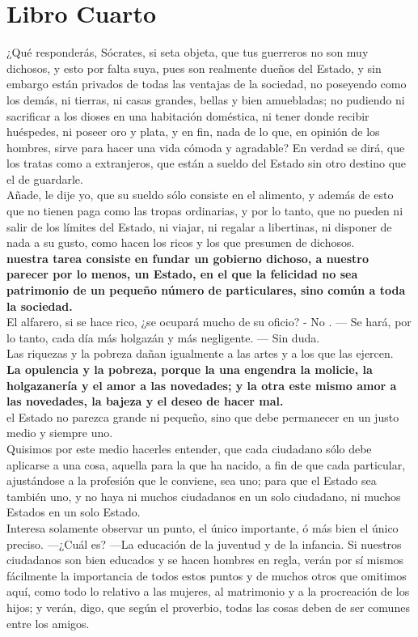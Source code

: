 \documentclass[10pt]{book}
\begin{document}
\chapter*{Libro Cuarto}
 ¿Qué responderás, Sócrates, si seta objeta, que tus guerreros no son muy dichosos, y esto por falta suya, pues son realmente dueños del Estado, y sin embargo están privados de todas las ventajas de la sociedad, no poseyendo como los demás, ni tierras, ni casas grandes, bellas y bien amuebladas; no pudiendo ni sacrificar a los dioses en una habitación doméstica, ni tener donde recibir huéspedes, ni poseer oro y plata, y en fin, nada de lo que, en opinión de los hombres, sirve para hacer una vida cómoda y agradable? En verdad se dirá, que los tratas como a extranjeros, que están a sueldo del Estado sin otro destino que el de guardarle.\\ Añade, le dije yo, que su sueldo sólo consiste en el alimento, y además de esto que no tienen paga como las tropas ordinarias, y por lo tanto, que no pueden ni salir de los límites del Estado, ni viajar, ni regalar a libertinas, ni disponer de nada a su gusto, como hacen los ricos y los que presumen de dichosos. \\
\textbf{nuestra tarea consiste en fundar un gobierno dichoso, a nuestro parecer por lo menos, un Estado, en el que la felicidad no sea patrimonio de un pequeño número de particulares, sino común a toda la sociedad.}\\
El alfarero, si se hace rico, ¿se ocupará mucho de su oficio? - No . — Se hará, por lo tanto, cada día más holgazán y más negligente. — Sin duda. \\
Las riquezas y la pobreza dañan igualmente a las artes y a los que las ejercen.\\
\textbf{La opulencia y la pobreza, porque la una engendra la molicie, la holgazanería y el amor a las novedades; y la otra este mismo amor a las novedades, la bajeza y el deseo de hacer mal.}\\
el Estado no parezca grande ni pequeño, sino que debe permanecer en un justo medio y siempre uno. \\
Quisimos por este medio hacerles entender, que cada ciudadano sólo debe aplicarse a una cosa, aquella para la que ha nacido, a fin de que cada particular, ajustándose a la profesión que le conviene, sea uno; para que el Estado sea también uno, y no haya ni muchos ciudadanos en un solo ciudadano, ni muchos Estados en un solo Estado.\\
Interesa solamente observar un punto, el único importante, ó más bien el único preciso. —¿Cuál es? —La educación de la juventud y de la infancia. Si nuestros ciudadanos son bien educados y se hacen hombres en regla, verán por sí mismos fácilmente la importancia de todos estos puntos y de muchos otros que omitimos aquí, como todo lo relativo a las mujeres, al matrimonio y a la procreación de los hijos; y verán, digo, que según el proverbio, todas las cosas deben de ser comunes entre los amigos. \\
\end{document}
